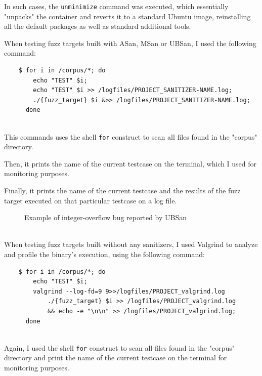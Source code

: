 In such cases, the \verb|unminimize| command was executed, which essentially "unpacks" the container and reverts it to a standard Ubuntu image, reinstalling all the default packages as well as standard additional tools.


When testing fuzz targets built with ASan, MSan or UBSan, I used the following command:
\begin{verbatim}
    $ for i in /corpus/*; do 
        echo "TEST" $i; 
        echo "TEST" $i >> /logfiles/PROJECT_SANITIZER-NAME.log; 
        ./{fuzz_target} $i &>> /logfiles/PROJECT_SANITIZER-NAME.log; 
      done
\end{verbatim}
\ \\
This commands uses the shell \verb|for| construct to scan all files found in the "corpus" directory.

Then, it prints the name of the current testcase on the terminal, which I used for monitoring purposes.

Finally, it prints the name of the current testcase and the results of the fuzz target executed on that particular testcase on a log file.

\begin{figure}[h]
\caption{Example of integer-overflow bug reported by UBSan}
\label{fig:ubsan_example}
\end{figure}
\ \\


When testing fuzz targets built without any sanitizers, I used Valgrind to analyze and profile the binary's execution, using the following command:
\begin{verbatim}
    $ for i in /corpus/*; do 
        echo "TEST" $i; 
        valgrind --log-fd=9 9>>/logfiles/PROJECT_valgrind.log 
            ./{fuzz_target} $i >> /logfiles/PROJECT_valgrind.log 
            && echo -e "\n\n" >> /logfiles/PROJECT_valgrind.log; 
      done
\end{verbatim}
\ \\
Again, I used the shell \verb|for| construct to scan all files found in the "corpus" directory and print the name of the current testcase on the terminal for monitoring purposes.

